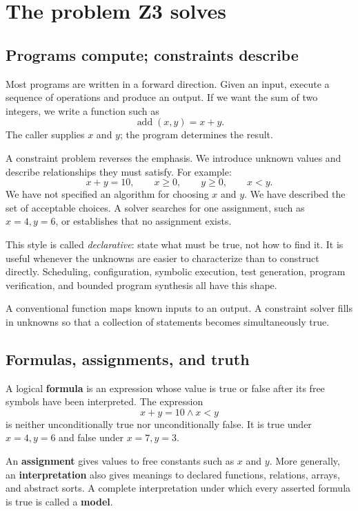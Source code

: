 \documentclass[10pt,letterpaper,oneside]{report}
\newcommand{\term}[1]{\textbf{#1}}
\begin{document}
\chapter{The problem Z3 solves}
\label{chap:problem}

\section{Programs compute; constraints describe}

Most programs are written in a forward direction. Given an input, execute a sequence of operations and produce an output. If we want the sum of two integers, we write a function such as
\[
  \operatorname{add}(x,y)=x+y.
\]
The caller supplies $x$ and $y$; the program determines the result.

A constraint problem reverses the emphasis. We introduce unknown values and describe relationships they must satisfy. For example:
\[
  x+y=10,\qquad x\ge 0,\qquad y\ge 0,\qquad x<y.
\]
We have not specified an algorithm for choosing $x$ and $y$. We have described the set of acceptable choices. A solver searches for one assignment, such as $x=4,y=6$, or establishes that no assignment exists.

This style is called \emph{declarative}: state what must be true, not how to find it. It is useful whenever the unknowns are easier to characterize than to construct directly. Scheduling, configuration, symbolic execution, test generation, program verification, and bounded program synthesis all have this shape.

\begin{mentalmodel}
A conventional function maps known inputs to an output. A constraint solver fills in unknowns so that a collection of statements becomes simultaneously true.
\end{mentalmodel}

\section{Formulas, assignments, and truth}

A logical \term{formula} is an expression whose value is true or false after its free symbols have been interpreted. The expression
\[
  x+y=10 \land x<y
\]
is neither unconditionally true nor unconditionally false. It is true under $x=4,y=6$ and false under $x=7,y=3$.

An \term{assignment} gives values to free constants such as $x$ and $y$. More generally, an \term{interpretation} also gives meanings to declared functions, relations, arrays, and abstract sorts. A complete interpretation under which every asserted formula is true is called a \term{model}.
\end{document}
